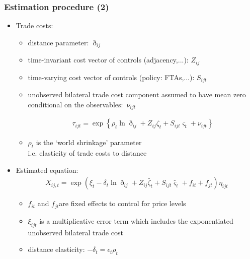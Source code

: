 \documentclass{beamer}
\begin{document}
\begin{frame}[plain]\frametitle{Estimation procedure (2)}
\begin{itemize}
\item Trade costs: 
	\begin{itemize}
	\item distance parameter: $\eth_{ij}$
	\item time-invariant cost vector of controls (adjacency,...): $Z_{ij}$
	\item time-varying cost vector of controls (policy: FTAs,...): $S_{ijt}$
	\item unobserved bilateral trade cost component assumed to have mean zero conditional on the observables: $\nu_{ijt}$ 

\begin{gather}
\tau_{ijt}=\exp\left\{\rho_t\ln{\eth_{ij}}+{Z_{ij}}\zeta_{t}+{S_{ijt}}\varsigma_{t}+\nu_{ijt}\right\} \nonumber
\end{gather}
	\item $\rho_t$ is the `world shrinkage' parameter \\ 
\hspace{1cm} i.e. elasticity of trade costs to distance
	\end{itemize}
\item Estimated equation:
\begin{gather}
X_{ij,t}=\exp{\left(\xi_t-\delta_{t}\ln{\eth_{ij}}+{Z_{ij}}\tilde{\zeta_{t}}+{S_{ijt}}\tilde{\varsigma_{t}}+f_{it}+f_{jt}\right)\eta_{ijt}} \nonumber
\end{gather}
	\begin{itemize}
	\item $f_{it}$ and $f_{jt}$are fixed effects to control for price levels
	\item $\xi_{ijt}$ is a multiplicative error term which includes the exponentiated unobserved bilateral trade cost
	\item distance elasticity: $-\delta_{t}=\epsilon_{t}\rho_t$
	\end{itemize}
\end{itemize}
\end{frame}
\end{document}
